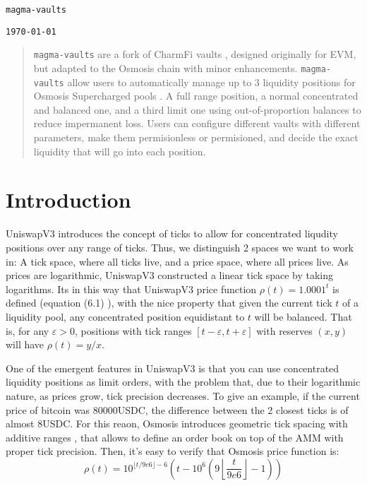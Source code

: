 \documentclass[11pt]{article}
\begin{document}
\begin{center}
\texttt{\Large magma-vaults}

\vspace{0.5em} %
\texttt{\large \today}
\end{center}

\begin{abstract}
    \texttt{magma-vaults} are a fork of CharmFi vaults \cite{charmfi-doc},
    designed originally for EVM, but adapted to the Osmosis chain with minor
    enhancements. \texttt{magma-vaults} allow users to automatically manage up to 3
    liquidity positions for Osmosis Supercharged pools
    \cite{osmosis-supercharged-doc}. A full range position, a normal
    concentrated and balanced one, and a third limit one using out-of-proportion
    balances to reduce impermanent loss. Users can configure different vaults
    with different parameters, make them permisionless or permisioned, and
    decide the exact liquidity that will go into each position.
\end{abstract}

\section{Introduction}
UniswapV3 introduces the concept of ticks to allow for concentrated liqudity
positions over any range of ticks. Thus, we distinguish 2 spaces we want to work in:
A tick space, where all ticks live, and a price space, where all prices live. As
prices are logarithmic, UniswapV3 constructed a linear tick space by taking logarithms.
Its in this way that UniswapV3 price function $\rho(t) = 1.0001^t$ is defined 
(equation (6.1) \citep{uniswapv3}), with the nice property that given the current
tick $t$ of a liquidity pool, any concentrated position equidistant to $t$ will
be balanced. That is, for any $\varepsilon > 0$, positions with tick ranges
$[t-\varepsilon, t + \varepsilon]$ with reserves $(x, y)$ will have $\rho(t) =
y/x$.

One of the emergent features in UniswapV3 is that you can use concentrated
liquidity positions as limit orders, with the problem that, due to their
logarithmic nature, as prices grow, tick precision decreases. To give
an example, if the current price of bitcoin was 80000USDC, the difference
between the 2 closest ticks is of almost 8USDC. For this reaon, Osmosis introduces
geometric tick spacing with additive ranges \cite{osmosis-price-function}, that
allows to define an order book on top of the AMM with proper tick precision.
Then, it's easy to verify that Osmosis price function is:
\[
\rho(t) = 10^{\lfloor t/9e6\rfloor - 6} \left(
    t - 10^6\left(9\left\lfloor\frac{t}{9e6}\right\rfloor - 1\right)
\right)
\]
\end{document}
